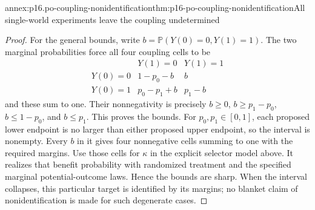 \begin{annexitem}{annex:p16.po-coupling-nonidentification}{thm:p16-po-coupling-nonidentification}{All single-world experiments leave the coupling undetermined}
\begin{proof}
For the general bounds, write \(b=\mathbb P(Y(0)=0,Y(1)=1)\).
The two marginal probabilities force all four coupling cells to be
\[
\begin{array}{c|cc}
 &Y(1)=0&Y(1)=1\\\hline
 Y(0)=0&1-p_0-b&b\\
 Y(0)=1&p_0-p_1+b&p_1-b
\end{array}
\]
and these sum to one. Their nonnegativity is precisely
\(b\geq0\), \(b\geq p_1-p_0\), \(b\leq1-p_0\),
and \(b\leq p_1\). This proves the bounds. For
\(p_0,p_1\in[0,1]\), each proposed lower endpoint is no larger
than either proposed upper endpoint, so the interval is nonempty.
Every \(b\) in it gives four nonnegative cells summing to one
with the required margins. Use those cells for \(\kappa\) in
the explicit selector model above. It realizes that benefit
probability with randomized treatment and the specified marginal
potential-outcome laws. Hence the bounds are sharp. When the
interval collapses, this particular target is identified by its
margins; no blanket claim of nonidentification is made for such
degenerate cases.
\end{proof}
\end{annexitem}
